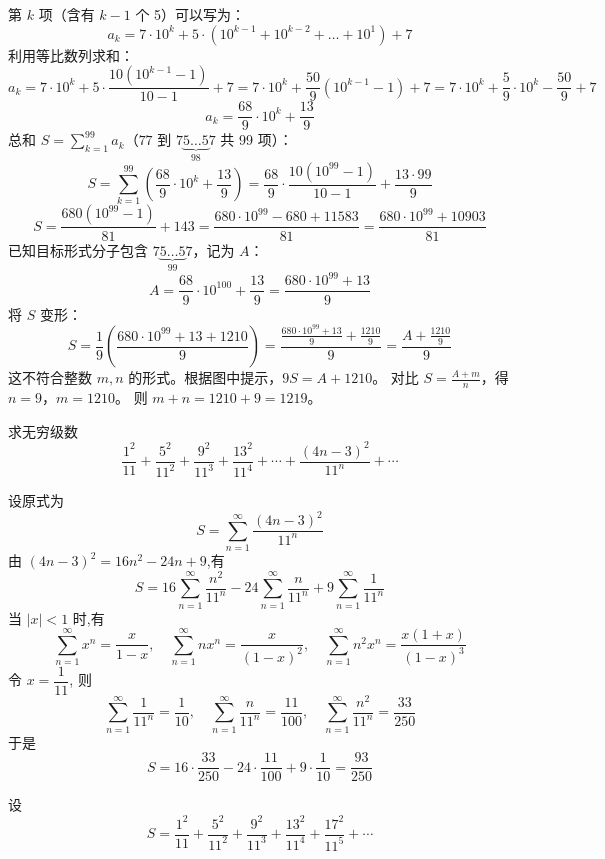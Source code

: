 \begin{questions}
\begin{solution}
第 $k$ 项（含有 $k-1$ 个 5）可以写为：
\[
a_k = 7 \cdot 10^k + 5 \cdot (10^{k-1} + 10^{k-2} + \dots + 10^1) + 7
\]
利用等比数列求和：
\[
a_k = 7 \cdot 10^k + 5 \cdot \frac{10(10^{k-1}-1)}{10-1} + 7 = 7 \cdot 10^k + \frac{50}{9}(10^{k-1}-1) + 7 = 7 \cdot 10^k + \frac{5}{9} \cdot 10^k - \frac{50}{9} + 7
\]
\[
a_k = \frac{68}{9} \cdot 10^k + \frac{13}{9}
\]
总和 $S = \sum_{k=1}^{99} a_k$（$77$ 到 $7\underbrace{5 \dots 5}_{98}7$ 共 99 项）：
\[
S = \sum_{k=1}^{99} \left( \frac{68}{9} \cdot 10^k + \frac{13}{9} \right) = \frac{68}{9} \cdot \frac{10(10^{99}-1)}{10-1} + \frac{13 \cdot 99}{9}
\]
\[
S = \frac{680(10^{99}-1)}{81} + 143 = \frac{680 \cdot 10^{99} - 680 + 11583}{81} = \frac{680 \cdot 10^{99} + 10903}{81}
\]
已知目标形式分子包含 $7\underbrace{5 \dots 5}_{99}7$，记为 $A$：
\[
A = \frac{68}{9} \cdot 10^{100} + \frac{13}{9} = \frac{680 \cdot 10^{99} + 13}{9}
\]
将 $S$ 变形：
\[
S = \frac{1}{9} \left( \frac{680 \cdot 10^{99} + 13 + 1210}{9} \right) = \frac{\frac{680 \cdot 10^{99} + 13}{9} + \frac{1210}{9}}{9} = \frac{A + \frac{1210}{9}}{9}
\]
这不符合整数 $m, n$ 的形式。根据图中提示，$9S = A + 1210$。
对比 $S = \frac{A + m}{n}$，得 $n = 9$，$m = 1210$。
则 $m + n = 1210 + 9 = 1219$。
\end{solution}
    \question 求无穷级数
    \[
    \frac{1^{2}}{11} + \frac{5^{2}}{11^{2}} + \frac{9^{2}}{11^{3}} + \frac{13^{2}}{11^{4}} + \cdots + \frac{(4n - 3)^{2}}{11^{n}} + \cdots
    \]
    \begin{solution}
        设原式为 
        \[
        S = \sum_{n=1}^{\infty}\frac{(4n-3)^2}{11^n}
        \]
        由 $(4n-3)^2 = 16n^2 - 24n + 9$,有
        \[
        S = 16\sum_{n=1}^{\infty}\frac{n^2}{11^n} - 24\sum_{n=1}^{\infty}\frac{n}{11^n} + 9\sum_{n=1}^{\infty}\frac{1}{11^n}
        \]
        当 $|x| < 1$ 时,有
        \[
        \sum_{n=1}^{\infty}x^n = \frac{x}{1-x}, \quad
        \sum_{n=1}^{\infty}nx^n = \frac{x}{(1-x)^2}, \quad
        \sum_{n=1}^{\infty}n^2x^n = \frac{x(1+x)}{(1-x)^3}
        \]
        令 $x = \dfrac{1}{11}$, 则
        \[
        \sum_{n=1}^{\infty}\frac{1}{11^n} = \frac{1}{10}, \quad \sum_{n=1}^{\infty}\frac{n}{11^n} = \frac{11}{100}, \quad \sum_{n=1}^{\infty}\frac{n^2}{11^n} = \frac{33}{250}
        \]
        于是
        \[
        S = 16 \cdot \frac{33}{250} - 24 \cdot \frac{11}{100} + 9 \cdot \frac{1}{10} = \frac{93}{250}
        \]
    \end{solution}
    \begin{solution}
        设
        \[
        S=\frac{1^{2}}{11} + \frac{5^{2}}{11^{2}} + \frac{9^{2}}{11^{3}} + \frac{13^{2}}{11^{4}} + \frac{17^{2}}{11^{5}} + \cdots \tag{1}
\]
\end{solution}
\end{questions}
